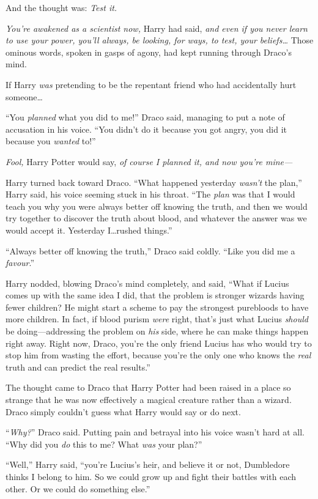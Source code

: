 And the thought was: \emph{Test it.}

\emph{You’re awakened as a scientist now,} Harry had said, \emph{and even if you never learn to use your power, you’ll always, be looking, for ways, to test, your beliefs…} Those ominous words, spoken in gasps of agony, had kept running through Draco’s mind.

If Harry \emph{was} pretending to be the repentant friend who had accidentally hurt someone…

“You \emph{planned} what you did to me!” Draco said, managing to put a note of accusation in his voice. “You didn’t do it because you got angry, you did it because you \emph{wanted} to!”

\emph{Fool,} Harry Potter would say, \emph{of course I planned it, and now you’re mine—}

Harry turned back toward Draco. “What happened yesterday \emph{wasn’t} the plan,” Harry said, his voice seeming stuck in his throat. “The \emph{plan} was that I would teach you why you were always better off knowing the truth, and then we would try together to discover the truth about blood, and whatever the answer was we would accept it. Yesterday I…rushed things.”

“Always better off knowing the truth,” Draco said coldly. “Like you did me a \emph{favour}.”

Harry nodded, blowing Draco’s mind completely, and said, “What if Lucius comes up with the same idea I did, that the problem is stronger wizards having fewer children? He might start a scheme to pay the strongest purebloods to have more children. In fact, if blood purism \emph{were} right, that’s just what Lucius \emph{should} be doing—addressing the problem on \emph{his} side, where he can make things happen right away. Right now, Draco, you’re the only friend Lucius has who would try to stop him from wasting the effort, because you’re the only one who knows the \emph{real} truth and can predict the real results.”

The thought came to Draco that Harry Potter had been raised in a place so strange that he was now effectively a magical creature rather than a wizard. Draco simply couldn’t guess what Harry would say or do next.

“\emph{Why?}” Draco said. Putting pain and betrayal into his voice wasn’t hard at all. “Why did you \emph{do} this to me? What \emph{was} your plan?”

“Well,” Harry said, “you’re Lucius’s heir, and believe it or not, Dumbledore thinks I belong to him. So we could grow up and fight their battles with each other. Or we could do something else.”

